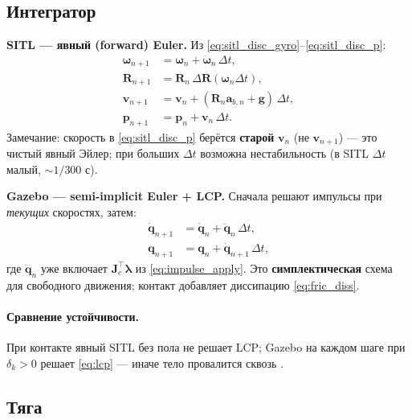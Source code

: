\documentclass[a4paper,11pt]{article}
\newcommand{\code}[1]{\texttt{\detokenize{#1}}}
\newcommand{\vect}[1]{\bm{#1}}
\newcommand{\mat}[1]{\bm{#1}}
\begin{document}
\subsection{Интегратор}

\textbf{SITL --- явный (forward) Euler.}
Из \eqref{eq:sitl_disc_gyro}--\eqref{eq:sitl_disc_p}:
\begin{align}
  \vect{\omega}_{n+1} &= \vect{\omega}_n + \ddot{\vect{\omega}}_n\,\Delta t,
  \\
  \mat{R}_{n+1} &= \mat{R}_n\,\Delta\mat{R}(\vect{\omega}_n\Delta t),
  \\
  \vect{v}_{n+1} &= \vect{v}_n + (\mat{R}_n\vect{a}_{b,n} + \vect{g})\,\Delta t,
  \\
  \vect{p}_{n+1} &= \vect{p}_n + \vect{v}_n\,\Delta t.
  \label{eq:sitl_euler_explicit}
\end{align}
Замечание: скорость в \eqref{eq:sitl_disc_p} берётся \textbf{старой}
$\vect{v}_n$ (не $\vect{v}_{n+1}$) --- это чистый явный Эйлер;
при больших $\Delta t$ возможна нестабильность (в SITL $\Delta t$ малый,
$\sim 1/300$ с).

\textbf{Gazebo --- semi-implicit Euler + LCP.}
Сначала решают импульсы при \emph{текущих} скоростях, затем:
\begin{align}
  \dot{\vect{q}}_{n+1} &= \dot{\vect{q}}_n + \ddot{\vect{q}}_n\,\Delta t,
  \label{eq:gazebo_vel_int}\\
  \vect{q}_{n+1} &= \vect{q}_n + \dot{\vect{q}}_{n+1}\,\Delta t,
  \label{eq:gazebo_pos_int}
\end{align}
где $\ddot{\vect{q}}_n$ уже включает $\vect{J}_c^\top\vect{\lambda}$ из
\eqref{eq:impulse_apply}. Это \textbf{симплектическая} схема для
свободного движения; контакт добавляет диссипацию \eqref{eq:fric_diss}.

\paragraph{Сравнение устойчивости.}
При контакте явный SITL без пола не решает LCP; Gazebo на каждом шаге
при $\delta_k > 0$ решает \eqref{eq:lcp} --- иначе тело провалится сквозь
\code{plane}.

\subsection{Тяга}
\end{document}
